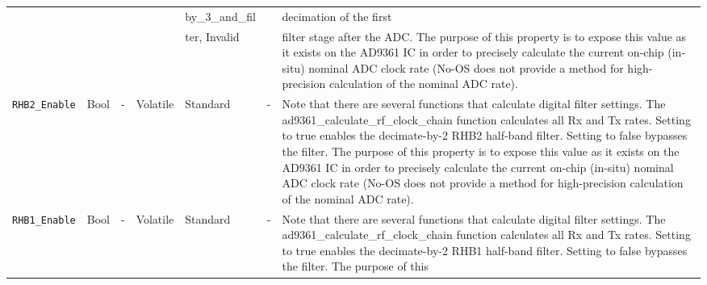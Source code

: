 \documentclass{article}
\begin{document}
\begin{landscape}
\begin{scriptsize}
\begin{longtable}{|p{3.6cm}|p{8.1cm}|p{1.4cm}|p{1.3cm}|p{1.4cm}|p{2.5cm}|p{3.6cm}|}
			                              &      &   &          & by\_3\_and\_fil  &   &  decimation of the first \\
			                              &      &   &          & ter, Invalid &   &  filter stage after
                                                the ADC. The purpose of this
                                                property is to expose this value
                                                as it exists on the AD9361 IC
                                                in order to precisely calculate
                                                the current on-chip (in-situ)
                                                nominal ADC clock rate (No-OS
                                                does not provide a method for
                                                high-precision calculation of
                                                the nominal ADC rate). \\
			\hline
			\verb+RHB2_Enable+ & Bool & - & Volatile & Standard & - & 
                               Note that there are several
                                 functions that calculate digital filter
                                 settings. The ad9361\_calculate\_rf\_clock\_chain
                                 function calculates all Rx and Tx rates.
                                 Setting to true enables the decimate-by-2
                                 RHB2 half-band filter. Setting to false
                                 bypasses the filter. The purpose of this
                                 property is to expose this value as it exists
                                 on the AD9361 IC in order to precisely
                                 calculate the current on-chip (in-situ) nominal
                                 ADC clock rate (No-OS does not provide a method
                                 for high-precision calculation of the nominal
                                 ADC rate). \\
			\hline
			\verb+RHB1_Enable+ & Bool & - & Volatile & Standard & - & 
                               Note that there are several
                                 functions that calculate digital filter
                                 settings. The ad9361\_calculate\_rf\_clock\_chain
                                 function calculates all Rx and Tx rates.
                                 Setting to true enables the decimate-by-2
                                 RHB1 half-band filter. Setting to false
                                 bypasses the filter. The purpose of this

\end{longtable}
\end{scriptsize}
\end{landscape}
\end{document}

